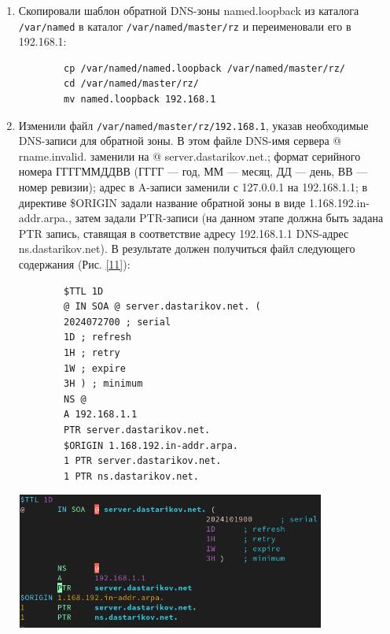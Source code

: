 \begin{enumerate}
    \item Скопировали шаблон обратной DNS-зоны named.loopback из каталога {\tt /var/named} в каталог {\tt /var/named/master/rz} и переименовали его в 192.168.1:
        \begin{verbatim}
        cp /var/named/named.loopback /var/named/master/rz/
        cd /var/named/master/rz/
        mv named.loopback 192.168.1
        \end{verbatim}
    \item Изменили файл {\tt /var/named/master/rz/192.168.1}, указав необходимые DNS-записи для обратной зоны. В этом файле DNS-имя сервера @ rname.invalid. заменили на @ server.dastarikov.net.; формат серийного номера ГГГГММДДВВ (ГГГГ — год, ММ — месяц, ДД — день, ВВ — номер ревизии); адрес в A-записи заменили с 127.0.0.1 на 192.168.1.1; в директиве \$ORIGIN задали название обратной зоны в виде 1.168.192.in-addr.arpa., затем задали PTR-записи (на данном этапе должна быть задана PTR запись, ставящая в соответствие адресу 192.168.1.1 DNS-адрес ns.dastarikov.net). В результате должен получиться файл следующего содержания (Рис. \ref{11}):
        \begin{verbatim}
        $TTL 1D
        @ IN SOA @ server.dastarikov.net. (
        2024072700 ; serial
        1D ; refresh
        1H ; retry
        1W ; expire
        3H ) ; minimum
        NS @
        A 192.168.1.1
        PTR server.dastarikov.net.
        $ORIGIN 1.168.192.in-addr.arpa.
        1 PTR server.dastarikov.net.
        1 PTR ns.dastarikov.net.
        \end{verbatim}

\begin{center}
    \centering
    \includegraphics[width=0.8\textwidth]{../images/image11.png}
    \label{11}
\end{center}


\end{enumerate}
